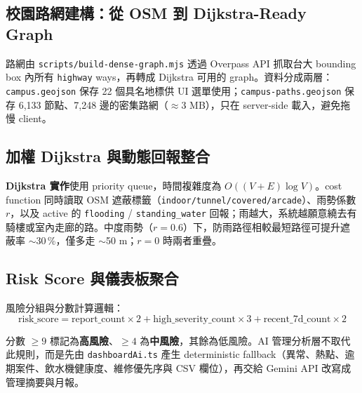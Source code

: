 \documentclass[11pt,a4paper]{article}
\begin{document}
\subsection{校園路網建構：從 OSM 到 Dijkstra-Ready Graph}

路網由 \texttt{scripts/build-dense-graph.mjs} 透過 Overpass API 抓取台大 bounding box 內所有 \texttt{highway} ways，再轉成 Dijkstra 可用的 graph。資料分成兩層：\texttt{campus.geojson} 保存 22 個具名地標供 UI 選單使用；\texttt{campus-paths.geojson} 保存 6{,}133 節點、7{,}248 邊的密集路網（$\approx$3 MB），只在 server-side 載入，避免拖慢 client。


\subsection{加權 Dijkstra 與動態回報整合}

\textbf{Dijkstra 實作}使用 priority queue，時間複雜度為 $O((V+E)\log V)$。cost function 同時讀取 OSM 遮蔽標籤（\texttt{indoor/tunnel/covered/arcade}）、雨勢係數 $r$，以及 active 的 \texttt{flooding} / \texttt{standing\_water} 回報；雨越大，系統越願意繞去有騎樓或室內走廊的路。中度雨勢（$r=0.6$）下，防雨路徑相較最短路徑可提升遮蔽率 $\sim$30\,\%，僅多走 $\sim$50 m；$r=0$ 時兩者重疊。

\subsection{Risk Score 與儀表板聚合}

風險分組與分數計算邏輯：
\[
\mathrm{risk\_score} = \mathrm{report\_count} \times 2 + \mathrm{high\_severity\_count} \times 3 + \mathrm{recent\_7d\_count} \times 2
\]

分數 $\geq 9$ 標記為\textcolor{danger}{\textbf{高風險}}、$\geq 4$ 為\textcolor{warn}{\textbf{中風險}}，其餘為低風險。AI 管理分析層不取代此規則，而是先由 \texttt{dashboardAi.ts} 產生 deterministic fallback（異常、熱點、逾期案件、飲水機健康度、維修優先序與 CSV 欄位），再交給 Gemini API 改寫成管理摘要與月報。
\end{document}
